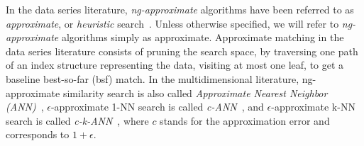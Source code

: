 
In the data series literature, \textit{ng-approximate} algorithms have been referred to as \emph{approximate}, or \emph{heuristic} search~\cite{journal/kais/Camerra2014,journal/vldb/Zoumpatianos2016,journal/edbt/Schafer2012,conf/vldb/Wang2013,dpisax,ulisse}.
Unless otherwise specified, %
we will refer to \textit{ng-approximate} algorithms simply as approximate. Approximate matching in the data series literature
consists of pruning the search space, by traversing one path of an index structure representing the data, visiting at most one leaf, to get a baseline best-so-far (bsf) match.
In the multidimensional literature, ng-approximate similarity search is also called \textit{Approximate Nearest Neighbor (ANN)}~\cite{journal/tpami/jegou2011}, $\epsilon$-approximate 1-NN search is called \textit{c-ANN}~\cite{conf/vldb/sun14}, and $\epsilon$-approximate k-NN search is called \textit{c-k-ANN}~\cite{qalsh}, where $c$ stands for the approximation error and corresponds to $1+\epsilon$. 




